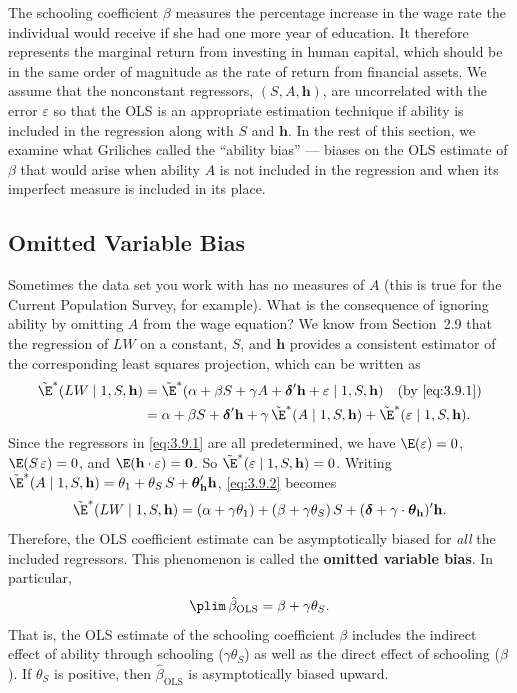 The schooling coefficient $\beta$ measures the percentage increase in the wage rate
the individual would receive if she had one more year of education.  It therefore
represents the marginal return from investing in human capital, which should be in
the same order of magnitude as the rate of return from financial assets.  We assume
that the nonconstant regressors, $(S, A, \mathbf{h})$, are uncorrelated with the error $\varepsilon$
so that the OLS is an appropriate estimation technique if ability is included in
the regression along with $S$ and $\mathbf{h}$.  In the rest of this section, we examine what
Griliches called the ``ability bias'' --- biases on the OLS estimate of $\beta$ that would
arise when ability $A$ is not included in the regression and when its imperfect measure
is included in its place.

\subsection*{Omitted Variable Bias}

Sometimes the data set you work with has no measures of $A$ (this is true for the
Current Population Survey, for example).  What is the consequence of ignoring
ability by omitting $A$ from the wage equation?  We know from Section~2.9 that
the regression of $LW$ on a constant, $S$, and $\mathbf{h}$ provides a consistent estimator of the
corresponding least squares projection, which can be written as
\begin{align}
  \tilde{\E}^*(LW \mid 1, S, \mathbf{h})
  &= \tilde{\E}^*(\alpha + \beta S + \gamma A + \boldsymbol{\delta}'\mathbf{h}
    + \varepsilon \mid 1, S, \mathbf{h})
  \quad \text{(by \eqref{eq:3.9.1})} \notag \\
  &= \alpha + \beta S + \boldsymbol{\delta}'\mathbf{h}
    + \gamma\, \tilde{\E}^*(A \mid 1, S, \mathbf{h})
    + \tilde{\E}^*(\varepsilon \mid 1, S, \mathbf{h}).
  \label{eq:3.9.2}
\end{align}
Since the regressors in \eqref{eq:3.9.1} are all predetermined, we have $\E(\varepsilon) = 0$,
$\E(S\,\varepsilon) = 0$, and $\E(\mathbf{h}\cdot\varepsilon) = \mathbf{0}$.  So
$\tilde{\E}^*(\varepsilon \mid 1, S, \mathbf{h}) = 0$.  Writing
$\tilde{\E}^*(A \mid 1, S, \mathbf{h}) = \theta_1 + \theta_S\, S + \boldsymbol{\theta}_{\mathbf{h}}'\mathbf{h}$,
\eqref{eq:3.9.2} becomes
\[
  \tilde{\E}^*(LW \mid 1, S, \mathbf{h})
  = (\alpha + \gamma \theta_1) + (\beta + \gamma \theta_S)\, S
  + (\boldsymbol{\delta} + \gamma \cdot \boldsymbol{\theta}_{\mathbf{h}})'\mathbf{h}.
\]
Therefore, the OLS coefficient estimate can be asymptotically biased for \emph{all} the
included regressors.  This phenomenon is called the \textbf{omitted variable bias}.  In
particular,
\[
  \plim\, \hat{\beta}_{\text{OLS}} = \beta + \gamma \theta_S.
\]
That is, the OLS estimate of the schooling coefficient $\beta$ includes the indirect effect
of ability through schooling ($\gamma \theta_S$) as well as the direct effect of schooling
($\beta$).  If $\theta_S$ is positive, then $\hat{\beta}_{\text{OLS}}$ is asymptotically biased upward.

